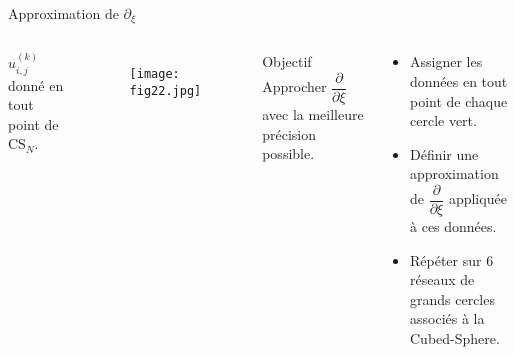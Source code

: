 \documentclass[11pt]{beamer}
\def\CS{\text{CS}}
\begin{document}
\begin{frame}{Approximation de $\partial_{\xi}$}
\begin{columns}
$u_{i,j}^{(k)}$ donné en tout point de $\CS_N$.
\begin{figure}
\begin{center}
\texttt{[image: fig22.jpg]}
\end{center}
\end{figure}
\begin{block}{Objectif}
Approcher $\dfrac{\partial}{\partial \xi}$ avec la meilleure précision possible.
\end{block}
\begin{block}{}
\begin{itemize}
\item Assigner les données en tout point de chaque cercle vert.
\item Définir une approximation de $\dfrac{\partial}{\partial \xi}$ appliquée à ces données.
\item Répéter sur 6 réseaux de grands cercles associés à la Cubed-Sphere.
\end{itemize}
\end{block}
\end{columns}
\end{frame}
\end{document}

